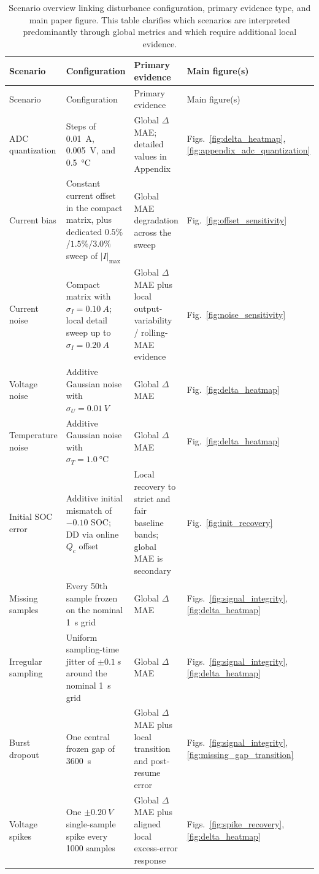\documentclass[review,nopreprintline]{elsarticle}
\begin{document}
\small
\begin{longtable}{p{2.3cm}p{3.0cm}p{4.0cm}p{1.7cm}}
\caption{Scenario overview linking disturbance configuration, primary evidence type, and main paper figure. This table clarifies which scenarios are interpreted predominantly through global metrics and which require additional local evidence.}\label{tab:appendix_scenario_overview}\\
\toprule
Scenario & Configuration & Primary evidence & Main figure(s) \\
\midrule
\endfirsthead
\toprule
Scenario & Configuration & Primary evidence & Main figure(s) \\
\midrule
\endhead
ADC quantization & Steps of \SI{0.01}{A}, \SI{0.005}{V}, and \SI{0.5}{\celsius} & Global $\Delta$MAE; detailed values in Appendix & Figs.~\ref{fig:delta_heatmap}, \ref{fig:appendix_adc_quantization} \\
Current bias & Constant current offset in the compact matrix, plus dedicated $0.5\%$/$1.5\%$/$3.0\%$ sweep of $|I|_{\max}$ & Global MAE degradation across the sweep & Fig.~\ref{fig:offset_sensitivity} \\
Current noise & Compact matrix with $\sigma_I=\SI{0.10}{A}$; local detail sweep up to $\sigma_I=\SI{0.20}{A}$ & Global $\Delta$MAE plus local output-variability / rolling-MAE evidence & Fig.~\ref{fig:noise_sensitivity} \\
Voltage noise & Additive Gaussian noise with $\sigma_U=\SI{0.01}{V}$ & Global $\Delta$MAE & Fig.~\ref{fig:delta_heatmap} \\
Temperature noise & Additive Gaussian noise with $\sigma_T=\SI{1.0}{\celsius}$ & Global $\Delta$MAE & Fig.~\ref{fig:delta_heatmap} \\
Initial SOC error & Additive initial mismatch of $-0.10$ SOC; DD via online $Q_c$ offset & Local recovery to strict and fair baseline bands; global MAE is secondary & Fig.~\ref{fig:init_recovery} \\
Missing samples & Every 50th sample frozen on the nominal \SI{1}{s} grid & Global $\Delta$MAE & Figs.~\ref{fig:signal_integrity}, \ref{fig:delta_heatmap} \\
Irregular sampling & Uniform sampling-time jitter of $\pm\SI{0.1}{s}$ around the nominal \SI{1}{s} grid & Global $\Delta$MAE & Figs.~\ref{fig:signal_integrity}, \ref{fig:delta_heatmap} \\
Burst dropout & One central frozen gap of \SI{3600}{s} & Global $\Delta$MAE plus local transition and post-resume error & Figs.~\ref{fig:signal_integrity}, \ref{fig:missing_gap_transition} \\
Voltage spikes & One $\pm\SI{0.20}{V}$ single-sample spike every 1000 samples & Global $\Delta$MAE plus aligned local excess-error response & Figs.~\ref{fig:spike_recovery}, \ref{fig:delta_heatmap} \\
\bottomrule
\end{longtable}
\normalsize
\end{document}
